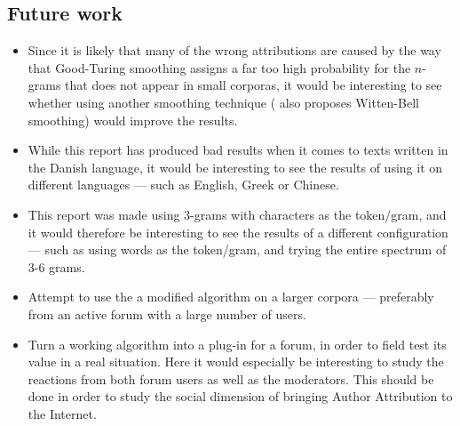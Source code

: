 \subsection{Future work}
\begin{itemize}
\item Since it is likely that many of the wrong attributions are caused by the way that Good-Turing smoothing assigns a far too high probability for the $n$-grams that does not appear in small corporas, it would be interesting to see whether using another smoothing technique (\cite{nr4} also proposes Witten-Bell smoothing) would improve the results.

\item While this report has produced bad results when it comes to texts written in the Danish language, it would be interesting to see the results of using it on different languages --- such as English, Greek or Chinese.

\item This report was made using 3-grams with characters as the token/gram, and it would therefore be interesting to see the results of a different configuration --- such as using words as the token/gram, and trying the entire spectrum of 3-6 grams. 

\item Attempt to use the a modified algorithm on a larger corpora --- preferably from an active forum with a large number of users. 

\item Turn a working algorithm into a plug-in for a forum, in order to field test its value in a real situation. Here it would especially be interesting to study the reactions from both forum users as well as the moderators. This should be done in order to study the social dimension of bringing Author Attribution to the Internet.
\end{itemize}
